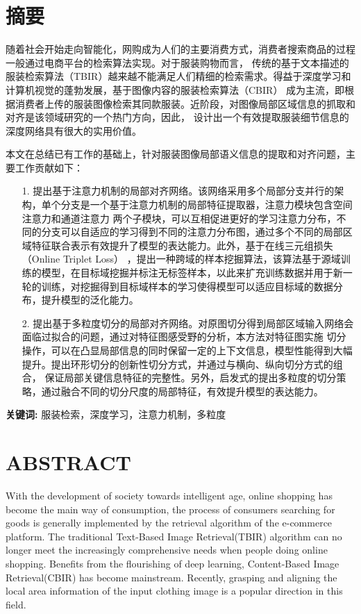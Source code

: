 \documentclass[figurelist,tablelist,nomlist,masters]{Style/seuthesix}
\begin{document}
\pagestyle{plain}
\chapter*{摘要}
  随着社会开始走向智能化，网购成为人们的主要消费方式，消费者搜索商品的过程一般通过电商平台的检索算法实现。对于服装购物而言，
  传统的基于文本描述的服装检索算法（TBIR）越来越不能满足人们精细的检索需求。得益于深度学习和计算机视觉的蓬勃发展，基于图像内容的服装检索算法（CBIR）
  成为主流，即根据消费者上传的服装图像检索其同款服装。近阶段，对图像局部区域信息的抓取和对齐是该领域研究的一个热门方向，因此，
  设计出一个有效提取服装细节信息的深度网络具有很大的实用价值。

  本文在总结已有工作的基础上，针对服装图像局部语义信息的提取和对齐问题，主要工作贡献如下：
  \begin{itemize}
    \item[1.]提出基于注意力机制的局部对齐网络。该网络采用多个局部分支并行的架构，单个分支是一个基于注意力机制的局部特征提取器，注意力模块包含空间注意力和通道注意力
      两个子模块，可以互相促进更好的学习注意力分布，不同的分支可以自适应的学习得到不同的注意力分布图，通过多个不同的局部区域特征联合表示有效提升了模型的表达能力。此外，基于在线三元组损失（Online Triplet Loss）
      ，提出一种跨域的样本挖掘算法，该算法基于源域训练的模型，在目标域挖掘并标注无标签样本，以此来扩充训练数据并用于新一轮的训练，对挖掘得到目标域样本的学习使得模型可以适应目标域的数据分布，提升模型的泛化能力。
    \item[2.]提出基于多粒度切分的局部对齐网络。对原图切分得到局部区域输入网络会面临过拟合的问题，通过对特征图感受野的分析，本方法对特征图实施
      切分操作，可以在凸显局部信息的同时保留一定的上下文信息，模型性能得到大幅提升。提出环形切分的创新性切分方式，并通过与横向、纵向切分方式的组合，
      保证局部关键信息特征的完整性。另外，启发式的提出多粒度的切分策略，通过融合不同的切分尺度的局部特征，有效提升模型的表达能力。
  \end{itemize}
  \vspace{3ex}
  \textbf{关键词:} 服装检索，深度学习，注意力机制，多粒度

\chapter*{ABSTRACT}
  With the development of society towards intelligent age, online shopping has become the main way of consumption, 
  the process of consumers searching for goods is generally implemented by the retrieval algorithm of the e-commerce platform. 
  The traditional Text-Based Image Retrieval(TBIR)
  algorithm can no longer meet the increasingly comprehensive needs when people doing online shopping. Benefits from the flourishing of deep learning, 
  Content-Based Image Retrieval(CBIR) has become mainstream. Recently, grasping and aligning the local area information of the input  clothing image is a 
  popular direction in this field. 
  
\end{document}

